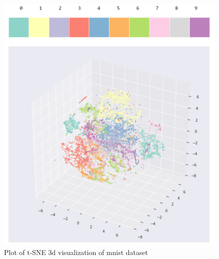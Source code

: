 \documentclass[11pt, oneside]{article}
\begin{document}
\begin{figure}
\includegraphics{./pics/tsne_pca_3d.PNG}
\caption{Plot of t-SNE 3d visualization of mnist dataset}
\end{figure}
\end{document}
